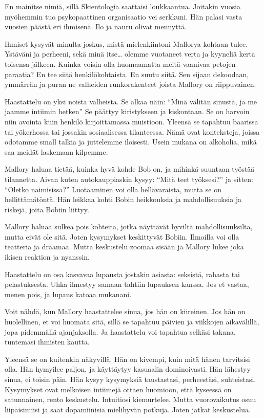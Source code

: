 En mainitse nimiä, sillä Skientologia saattaisi loukkaantua. Joitakin vuosia myöhemmin tuo psykopaattinen organisaatio vei serkkuni. Hän palasi vasta vuosien päästä eri ihmisenä. Ilo ja nauru olivat mennyttä.

Ihmiset kysyvät minulta joskus, mistä mielenkiintoni Mallorya kohtaan tulee. Ystäväni ja perheeni, sekä minä itse{\ldots} olemme vuotaneet verta ja kyyneliä kerta toisensa jälkeen. Kuinka voisin olla huomaamatta meitä vaanivaa petojen paraatia? En tee siitä henkilökohtaista. En suutu siitä. Sen sijaan dekoodaan, ymmärrän ja puran ne valheiden runkorakenteet joista Mallory on riippuvainen.

Haastattelu on yksi noista valheista. Se alkaa näin: ``Minä välitän sinusta, ja me jaamme intiimin hetken'' Se päättyy kiristykseen ja kiskontaan. Se on harvoin niin avointa kuin henkilö kirjoittamassa muistioon. Yleensä se tapahtuu baarissa tai yökerhossa tai jossakin sosiaalisessa tilanteessa. Nämä ovat konteksteja, joissa odotamme small talkia ja juttelemme iloisesti. Usein mukana on alkoholia, mikä saa meidät laskemaan kilpemme.

Mallory haluaa tietää, kuinka hyvä kohde Bob on, ja mihinkä suuntaan työstää tilannetta. Aivan kuten autokauppiaskin kysyy: ``Mitä teet työksesi?'' ja sitten: ``Oletko naimisissa?'' Luotaaminen voi olla hellävaraista, mutta se on hellittämätöntä. Hän leikkaa kohti Bobin heikkouksia ja mahdollisuuksia ja riskejä, joita Bobiin liittyy.

Mallory haluaa sulkea pois kohteita, jotka näyttävät hyviltä mahdollisuuksilta, mutta eivät ole sitä. Joten kysymykset keskittyvät Bobiin. Ilmoilla voi olla teatteria ja draamaa. Mutta keskustelu zoomaa sisään ja Mallory lukee joka ikisen reaktion ja nyanssin.

Haastattelu on osa kasvavaa lupausta jostakin asiasta: seksistä, rahasta tai pelastuksesta. Uhka ilmestyy samaan tahtiin lupauksen kanssa. Jos et vastaa, menen pois, ja lupaus katoaa mukanani.

Voit nähdä, kun Mallory haastattelee sinua, jos hän on kiireinen. Jos hän on huolellinen, et voi huomata sitä, sillä se tapahtuu päivien ja viikkojen aikavälillä, jopa pidemmällä ajanjaksolla. Ja haastattelu voi tapahtua selkäsi takana, tuntemasi ihmisten kautta.

Yleensä se on kuitenkin näkyvillä. Hän on kivempi, kuin mitä hänen tarvitsisi olla. Hän hymyilee paljon, ja käyttäytyy kasuaalin dominoivasti. Hän lähestyy sinua, ei toisin päin. Hän kysyy kysymyksiä taustastasi, perheestäsi, suhteistasi. Kysymykset ovat melkoisen intiimejä ottaen huomioon, että kyseessä on satunnainen, rento keskustelu. Intuitiosi kiemurtelee. Mutta vuorovaikutus osuu liipaisimiisi ja saat dopamiinisia mielihyvän potkuja. Joten jatkat keskustelua.

